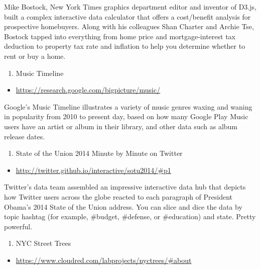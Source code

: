 \documentclass[]{book}
\providecommand{\tightlist}{%
  \setlength{\itemsep}{0pt}\setlength{\parskip}{0pt}}
\theoremstyle{definition}
\theoremstyle{definition}
\theoremstyle{definition}
\theoremstyle{remark}
\begin{document}
Mike Bostock, New York Times graphics department editor and inventor of
D3.js, built a complex interactive data calculator that offers a
cost/benefit analysis for prospective homebuyers. Along with his
colleagues Shan Charter and Archie Tse, Bostock tapped into everything
from home price and mortgage-interest tax deduction to property tax rate
and inflation to help you determine whether to rent or buy a home.

\begin{enumerate}
\def\labelenumi{\arabic{enumi}.}
\setcounter{enumi}{5}
\tightlist
\item
  Music Timeline
\end{enumerate}

\begin{itemize}
\tightlist
\item
  \url{https://research.google.com/bigpicture/music/}
\end{itemize}

Google's Music Timeline illustrates a variety of music genres waxing and
waning in popularity from 2010 to present day, based on how many Google
Play Music users have an artist or album in their library, and other
data such as album release dates.

\begin{enumerate}
\def\labelenumi{\arabic{enumi}.}
\setcounter{enumi}{6}
\tightlist
\item
  State of the Union 2014 Minute by Minute on Twitter
\end{enumerate}

\begin{itemize}
\tightlist
\item
  \url{http://twitter.github.io/interactive/sotu2014/\#p1}
\end{itemize}

Twitter's data team assembled an impressive interactive data hub that
depicts how Twitter users across the globe reacted to each paragraph of
President Obama's 2014 State of the Union address. You can slice and
dice the data by topic hashtag (for example, \#budget, \#defense, or
\#education) and state. Pretty powerful.

\begin{enumerate}
\def\labelenumi{\arabic{enumi}.}
\setcounter{enumi}{7}
\tightlist
\item
  NYC Street Trees
\end{enumerate}

\begin{itemize}
\tightlist
\item
  \url{https://www.cloudred.com/labprojects/nyctrees/\#about}
\end{itemize}
\end{document}
